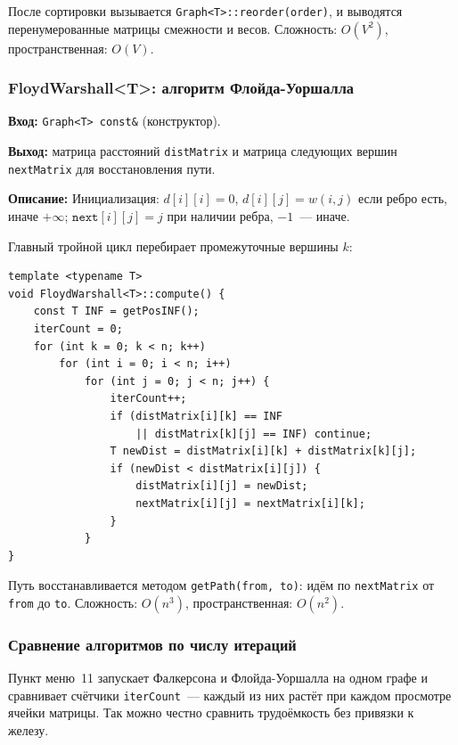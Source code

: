 После сортировки вызывается \texttt{Graph<T>::reorder(order)},
и выводятся перенумерованные матрицы смежности и весов.
Сложность: $O(V^2)$, пространственная: $O(V)$.

\subsubsection{FloydWarshall\textless T\textgreater: алгоритм Флойда-Уоршалла}

\textbf{Вход:} \texttt{Graph<T> const\&} (конструктор).

\textbf{Выход:} матрица расстояний \texttt{distMatrix} и матрица
следующих вершин \texttt{nextMatrix} для восстановления пути.

\textbf{Описание:} Инициализация:
$d[i][i] = 0$, $d[i][j] = w(i,j)$ если ребро есть, иначе $+\infty$;
$\texttt{next}[i][j] = j$ при наличии ребра, $-1$~--- иначе.

Главный тройной цикл перебирает промежуточные вершины $k$:

\begin{lstlisting}[style=cstyle, caption={Основной цикл Флойда-Уоршалла (warshall.cpp)}]
template <typename T>
void FloydWarshall<T>::compute() {
    const T INF = getPosINF();
    iterCount = 0;
    for (int k = 0; k < n; k++)
        for (int i = 0; i < n; i++)
            for (int j = 0; j < n; j++) {
                iterCount++;
                if (distMatrix[i][k] == INF
                    || distMatrix[k][j] == INF) continue;
                T newDist = distMatrix[i][k] + distMatrix[k][j];
                if (newDist < distMatrix[i][j]) {
                    distMatrix[i][j] = newDist;
                    nextMatrix[i][j] = nextMatrix[i][k];
                }
            }
}
\end{lstlisting}

Путь восстанавливается методом \texttt{getPath(from, to)}: идём по
\texttt{nextMatrix} от \texttt{from} до \texttt{to}.
Сложность: $O(n^3)$, пространственная: $O(n^2)$.

\subsubsection{Сравнение алгоритмов по числу итераций}

Пункт меню~11 запускает Фалкерсона и Флойда-Уоршалла на одном графе
и сравнивает счётчики \texttt{iterCount}~--- каждый из них растёт
при каждом просмотре ячейки матрицы. Так можно честно сравнить
трудоёмкость без привязки к железу.
